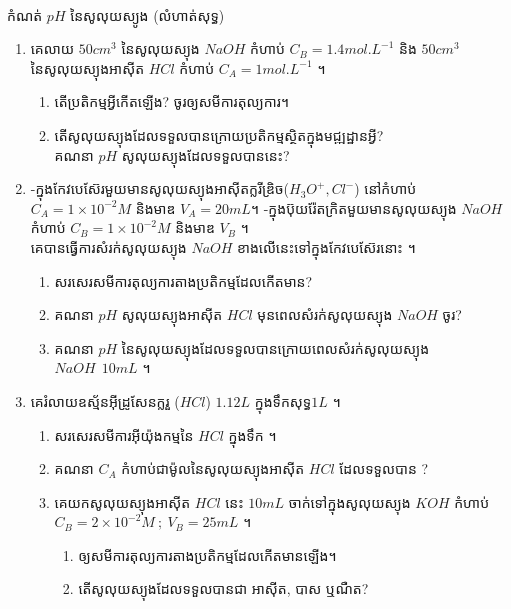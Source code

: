 \documentclass[12pt, a4paper]{article}
\begin{document}
	\begin{center}
		\sffamily\color{black}
		\\
		កំណត់ $pH$ នៃសូលុយស្យូង (លំហាត់សុទ្ធ)
	\end{center}
\maketitle
\begin{enumerate}[m, 2]
		\item គេលាយ $50cm^3$ នៃសូលុយស្យុង $NaOH$ កំហាប់ $C_B=1.4mol.L^{-1}$ និង $50cm^3$ នៃសូលុយស្យុងអាស៊ីត $HCl$ កំហាប់ $C_A=1mol.L^{-1}$ ។
		\begin{enumerate}[k]
			\item តើប្រតិកម្មអ្វីកើតឡើង? ចូរឲ្យសមីការតុល្យការ។
			\item តើសូលុយស្យុងដែលទទួលបានក្រោយប្រតិកម្មស្ថិតក្នុងមជ្ឍដ្ឋានអ្វី?\\
			គណនា $pH$ សូលុយស្យុងដែលទទួលបាននេះ?
		\end{enumerate}
		\item -ក្នុងកែវបេស៊ែរមួយមានសូលុយស្យុងអាស៊ីតក្លរីឌ្រិច($H_3O^+, Cl^-$) នៅកំហាប់ \\$C_A=1\times10^{-2}M$ និងមាឌ $V_A=20mL$។
		-ក្នុងប៊ុយរ៉ែតក្រិតមួយមានសូលុយស្យុង $NaOH$ កំហាប់ $C_B=1\times10^{-2}M$ និងមាឌ $V_B$ ។\\
		គេបានធ្វើការសំរក់សូលុយស្យុង $NaOH$ ខាងលើនេះទៅក្នុងកែវបេស៊ែរនោះ ។
		\begin{enumerate}[k]
			\item សរសេរសមីការតុល្យការតាងប្រតិកម្មដែលកើតមាន?
			\item គណនា $pH$ សូលុយស្យុងអាស៊ីត $HCl$ មុនពេលសំរក់សូលុយស្យុង $NaOH$ ចូរ?
			\item គណនា $pH$ នៃសូលុយស្យុងដែលទទួលបានក្រោយពេលសំរក់សូលុយស្យុង $NaOH~~10mL$ ។ 
		\end{enumerate}
		\item គេរំលាយឧស្ម័នអ៊ីដ្រូសែនក្លរួ ($HCl$) $1.12L$ ក្នុងទឹកសុទ្ធ$1L$ ។
		\begin{enumerate}[k]
			\item សរសេរសមីការអ៊ីយ៉ុងកម្មនៃ $HCl$ ក្នុងទឹក ។
			\item គណនា $C_A$ កំហាប់ជាម៉ូលនៃសូលុយស្យុងអាស៊ីត $HCl$ ដែលទទួលបាន ?
			\item គេយកសូលុយស្យុងអាស៊ីត $HCl$ នេះ $10mL$ ចាក់ទៅក្នុងសូលុយស្យុង $KOH$ កំហាប់ $C_B=2\times10^{-2}M~;~V_B=25mL$ ។
			\begin{enumerate}[m]
				\item ឲ្យសមីការតុល្យការតាងប្រតិកម្មដែលកើតមានឡើង។
				\item តើសូលុយស្យុងដែលទទួលបានជា អាស៊ីត, បាស ឬណឺត?\\

\end{enumerate}
\end{enumerate}
\end{enumerate}
\end{document}
